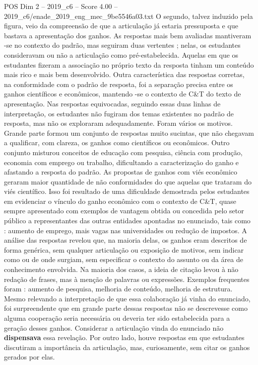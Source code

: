 \begin{textsample}{POS Dim 2 – 2019\_c6 – Score 4.00 – 2019\_c6/enade\_2019\_eng\_mec\_9be5546a03.txt}
O segundo, talvez induzido pela figura, veio da compreensão de que a articulação já estaria pressuposta e que bastava a apresentação dos ganhos.
As respostas mais bem avaliadas mantiveram -se no contexto do padrão, mas seguiram duas vertentes ; nelas, os estudantes consideravam ou não a articulação como pré-estabelecida.
Aquelas em que os estudantes fizeram a associação no próprio texto da resposta tinham um conteúdo mais rico e mais bem desenvolvido.
Outra característica das respostas corretas, na conformidade com o padrão de resposta, foi a separação precisa entre os ganhos científicos e econômicos, mantendo -se o contexto de C\&T do texto de apresentação.
Nas respostas equivocadas, seguindo essas duas linhas de interpretação, os estudantes não fugiram dos temas existentes no padrão de resposta, mas não os exploraram adequadamente.
Foram vários os motivos.
Grande parte formou um conjunto de respostas muito sucintas, que não chegavam a qualificar, com clareza, os ganhos como científicos ou econômicos.
Outro conjunto misturou conceitos de educação com pesquisa, ciência com produção, economia com emprego ou trabalho, dificultando a caracterização do ganho e afastando a resposta do padrão.
As propostas de ganhos com viés econômico geraram maior quantidade de não conformidades do que aquelas que trataram do viés científico.
Isso foi resultado de uma dificuldade demostrada pelos estudantes em evidenciar o vínculo do ganho econômico com o contexto de C\&T, quase sempre apresentado com exemplos de vantagem obtida ou concedida pelo setor público a representantes das outras entidades apontadas no enunciado, tais como : aumento de emprego, mais vagas nas universidades ou redução de impostos.
A análise das respostas revelou que, na maioria delas, os ganhos eram descritos de forma genérica, sem qualquer articulação ou exposição de motivos, sem indicar como ou de onde surgiam, sem especificar o contexto do assunto ou da área de conhecimento envolvida.
Na maioria dos casos, a ideia de citação levou à não redação de frases, mas à menção de palavras ou expressões.
Exemplos frequentes foram : aumento de pesquisa, melhoria de conteúdo, melhoria de estrutura.
Mesmo relevando a interpretação de que essa colaboração já vinha do enunciado, foi surpreendente que em grande parte dessas respostas não se descrevesse como alguma cooperação seria necessária ou deveria ter sido estabelecida para a geração desses ganhos.
Considerar a articulação vinda do enunciado não \textbf{dispensava} essa revelação.
Por outro lado, houve respostas em que estudantes discutiram a importância da articulação, mas, curiosamente, sem citar os ganhos gerados por elas.

\end{textsample}

